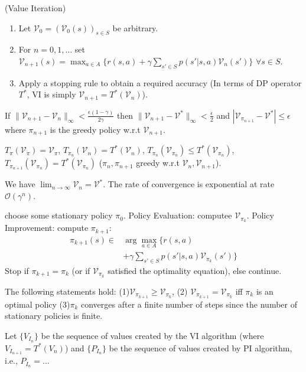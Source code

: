 \begin{algorithm}
(Value Iteration)
\begin{enumerate}
\item Let $\mathcal{V}_0 = (\mathcal{V}_0(s))_{s \in S}$ be arbitrary. 
\item For $n = 0,1, \ldots$ set $\mathcal{V}_{n+1}(s) = \max_{a \in A} \{r(s, a) + \gamma \sum_{s' \in S} p(s'|s, a)\mathcal{V}_n(s')\}$ $\forall s \in S$.
\item Apply a stopping rule to obtain a required accuracy (In terms of DP operator $T^*$, VI is simply $\mathcal{V}_{n+1} = T^*(\mathcal{V}_n)$).
\end{enumerate}
\end{algorithm}

\begin{lem}
If $\|\mathcal{V}_{n+1} - \mathcal{V}_n\|_\infty < \frac{\epsilon(1-\gamma)}{2\gamma}$ then $\|\mathcal{V}_{n+1} - \mathcal{V}^*\|_\infty < \frac{\epsilon}{2}$ and $|\mathcal{V}_{\pi_{n+1}} - \mathcal{V}^*| \leq \epsilon$ where $\pi_{n+1}$ is the greedy policy w.r.t $\mathcal{V}_{n+1}$.
\end{lem}

\begin{clm}
$T_\pi(\mathcal{V}_\pi) = \mathcal{V}_\pi$, $T_{\pi_n}(\mathcal{V}_n) = T^*(\mathcal{V}_n)$, $T_{\pi_n}(\mathcal{V}_{\pi_n}) \leq T^*(\mathcal{V}_{\pi_n})$, $T_{\pi_{n+1}}(\mathcal{V}_{\pi_n}) = T^*(\mathcal{V}_{\pi_n})$ ($\pi_n , \pi_{n+1}$ greedy w.r.t $\mathcal{V}_n,\mathcal{V}_{n+1}$).
\end{clm}

\begin{thm}
We have $\lim_{n \to \infty} \mathcal{V}_n = \mathcal{V}^*$. The rate of convergence is exponential at rate $\mathcal{O}(\gamma^n)$.
\end{thm}
\begin{greyboxedalgorithm}
\vspace{-0.5cm}
\begin{algorithm}[H]
\begin{footnotesize}
\caption{Policy Iteration}
\begin{algorithmic}[1]
\STATE choose some stationary policy $\pi_0$.
\STATE Policy Evaluation: computee $\mathcal{V}_{\pi_k}$.
\STATE Policy Improvement: compute $\pi_{k+1}$: \begin{align*}\pi_{k+1}(s) \in &\arg\max_{a \in A} \{r(s, a) \\&+ \gamma \sum_{s' \in S} p(s'|s, a)\mathcal{V}_{\pi_k}(s')\}
\end{align*}
\STATE Stop if $\pi_{k+1} = \pi_k$ (or if $\mathcal{V}_{\pi_k}$ satisfied the optimality equation), else continue.
\end{algorithmic}
\end{footnotesize}
\end{algorithm}
\end{greyboxedalgorithm}
\begin{thm}
The following statements hold: (1)$\mathcal{V}_{\pi_{k+1}} \geq \mathcal{V}_{\pi_k}$, (2) $\mathcal{V}_{\pi_{k+1}} = \mathcal{V}_{\pi_k}$ iff $\pi_k$ is an optimal policy (3)$\pi_k$ converges after a finite number of steps since the number of stationary policies is finite.
\end{thm}

\begin{thm}
Let $\{V_{I_n}\}$ be the sequence of values created by the VI algorithm (where $V_{I_{n+1}} = T^*(V_n)$) and $\{P_{I_n}\}$ be the sequence of values created by PI algorithm, i.e., $P_{I_n} = \ldots$
\end{thm}
